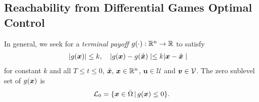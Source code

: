 \subsection{Reachability from Differential Games Optimal Control}

\noindent   In general, we seek for a \textit{terminal payoff} $g(\cdot): \mathbb{R}^n \rightarrow \mathbb{R}$ to satisfy
%
\begin{subequations}
	\begin{align}
		| g(\bm{x}) | &\le k, \quad | g(\bm{x}) - g(\hat{\bm{x}}) \mid \le k | \bm{x} - \hat{\bm{x}} \mid
	\end{align}
\end{subequations}
%
for constant $k$ and all $T \le t \le 0$, $\hat{\bm{x}}, \, \bm{x} \in \mathbb{R}^n$, $\bm{u}\in \mathcal{U}$ and $\bm{v} \in \mathcal{V}$.  The zero sublevel set of $g(\bm{x})$ is
%
\begin{align}
	\mathcal{L}_0 = \{ \bm{x} \in \bar{\Omega} \,|\, g(\bm{x}) \le 0 \}.
	\label{eq:target_set_syk}
\end{align}

